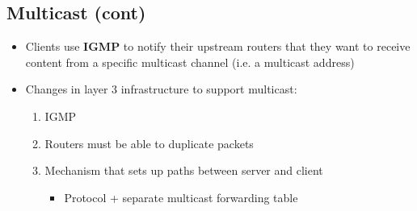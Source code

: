 \documentclass[11pt]{article}
\begin{document}
\subsection{Multicast (cont)}
\label{sec:orgheadline102}
\begin{itemize}
\item Clients use \textbf{IGMP} to notify their upstream routers that they want
to receive content from a specific multicast channel (i.e. a multicast
address)
\item Changes in layer 3 infrastructure to support multicast:
\begin{enumerate}
\item IGMP
\item Routers must be able to duplicate packets
\item Mechanism that sets up paths between server and client
\begin{itemize}
\item Protocol + separate multicast forwarding table
\end{itemize}
\end{enumerate}
\end{itemize}
\end{document}
